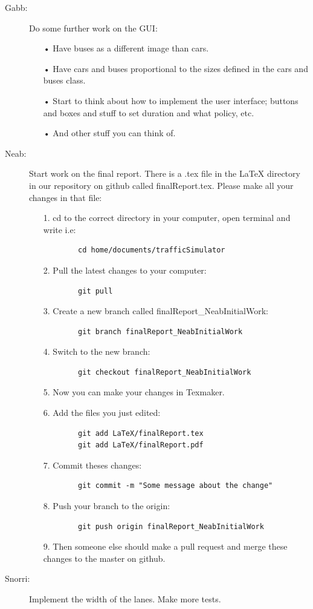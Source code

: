 \documentclass[11pt]{article}
\begin{document}
\begin{itemize}
\begin{description}
	\item[Gabb: ]Do some further work on the GUI:
	\begin{itemize}
		\item[•] Have buses as a different image than cars.
		\item[•] Have cars and buses proportional to the sizes defined in the cars and buses class. 
		\item[•] Start to think about how to implement the user interface; buttons and boxes and stuff to set duration and what policy, etc.
		\item[•] And other stuff you can think of.
	\end{itemize}
	\item[Neab: ] Start work on the final report. There is a .tex file in the LaTeX directory in our repository on github called finalReport.tex. Please make all your changes in that file:
	\begin{itemize}
		\item[1.] cd to the correct directory in your computer, open terminal and write i.e: 
		\begin{verbatim}
		cd home/documents/trafficSimulator
		\end{verbatim}
		\item[2.] Pull the latest changes to your computer:
		\begin{verbatim}
		git pull
		\end{verbatim}
		\item[3.] Create a new branch called finalReport\_NeabInitialWork: 
		\begin{verbatim}
		git branch finalReport_NeabInitialWork
		\end{verbatim}
		\item[4.] Switch to the new branch:
		\begin{verbatim}
		git checkout finalReport_NeabInitialWork
		\end{verbatim}
		\item[5.] Now you can make your changes in Texmaker.
		\item[6.] Add the files you just edited:
		\begin{verbatim}
		git add LaTeX/finalReport.tex
		git add LaTeX/finalReport.pdf
		\end{verbatim}
		\item[7.] Commit theses changes:
		\begin{verbatim}
		git commit -m "Some message about the change"
		\end{verbatim}
		\item[8.] Push your branch to the origin:
		\begin{verbatim}
		git push origin finalReport_NeabInitialWork
		\end{verbatim}
		\item[9.] Then someone else should make a pull request and merge these changes to the master on github.
	\end{itemize}
	\item[Snorri: ]Implement the width of the lanes. Make more tests.
	\end{description}	 
\end{itemize}
\end{document}

